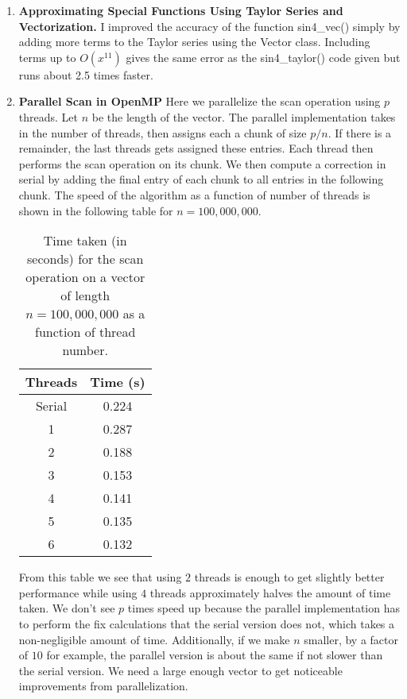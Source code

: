 \documentclass[11pt]{article}
\begin{document}
\begin{enumerate}

\item {\bf Approximating Special Functions Using Taylor Series and Vectorization.}  I improved the accuracy of the function sin4\_vec() simply by adding more terms to the Taylor series using the Vector class. Including terms up to $O(x^{11})$ gives the same error as the sin4\_taylor() code given but runs about 2.5 times faster. 


\item {\bf Parallel Scan in OpenMP} Here we parallelize the scan operation using $p$ threads. Let $n$ be the length of the vector. The parallel implementation takes in the number of threads, then assigns each a chunk of size $p/n$. If there is a remainder, the last threads gets assigned these entries. Each thread then performs the scan operation on its chunk. We then compute a correction in serial by adding the final entry of each chunk to all entries in the following chunk. The speed of the algorithm as a function of number of threads is shown in the following table for $n=100,000,000$. 

\begin{table}[h!] 
	\centering
	\begin{tabular}{c | c}
		Threads & Time (s)  \\
		\hline
		Serial & 0.224\\
		1 & 0.287\\ 
		2 & 0.188\\
		3 & 0.153\\
		4 & 0.141\\
		5 & 0.135\\
		6 & 0.132\\
	\end{tabular}
	\caption{Time taken (in seconds) for the scan operation on a vector of length $n=100,000,000$ as a function of thread number. }
\end{table}

From this table we see that using $2$ threads is enough to get slightly better performance while using $4$ threads approximately halves the amount of time taken. We don't see $p$ times speed up because the parallel implementation has to perform the fix calculations that the serial version does not, which takes a non-negligible amount of time. Additionally, if we make $n$ smaller, by a factor of $10$ for example, the parallel version is about the same if not slower than the serial version. We need a large enough vector to get noticeable improvements from parallelization.  














\end{enumerate}
\end{document}
